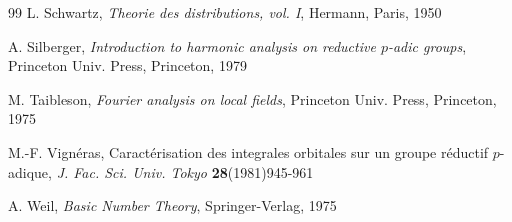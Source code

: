 \documentclass[12pt,letterpaper]{article}
\theoremstyle{definition}
\theoremstyle{remark}
\begin{document}
\begin{thebibliography}{99}
 L. Schwartz, 
{\it Theorie des distributions, vol. I}, Hermann, Paris, 1950

 A. Silberger, {\it Introduction to
harmonic analysis on reductive $p$-adic groups}, 
Princeton Univ. Press, Princeton, 1979

 M. Taibleson, {\it Fourier analysis on local
fields}, Princeton Univ. Press, Princeton, 1975

 M.-F. Vign\'eras,  Caract\'erisation des integrales 
orbitales sur un groupe r\'eductif $p$-adique,  
{\it J. Fac. Sci. Univ. Tokyo }
{\bf 28}(1981)945-961

 A. Weil, {\it Basic Number Theory}, Springer-Verlag, 
1975

\end{thebibliography}
\end{document}
